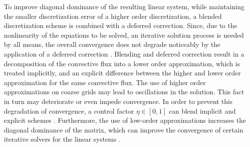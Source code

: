 To improve diagonal dominance of the resulting linear system, while maintaining the smaller discretization error of a higher order discretization, a blended discretization scheme is combined with a deferred correction. Since, due to the nonlinearity of the equations to be solved, an iterative solution process is needed by all means, the overall convergence does not degrade noticeably by the application of a deferred correction \cite{ferziger02}. Blending and deferred correction result in a decomposition of the convective flux into a lower order approximation, which is treated implicitly, and an explicit difference between the higher and lower order approximation for the same convective flux. The use of higher order approximations on coarse grids may lead to oscillations in the solution. This fact in turn may deteriorate or even impede convergence. In order to prevent this degradation of convergence, a control factor \( \eta \in [0,1]\) can blend implicit and explicit schemes . Furthermore, the use of low-order approximations increases the diagonal dominance of the matrix, which can improve the convergence of certain iterative solvers for the linear systems \cite{schaefer99}.

